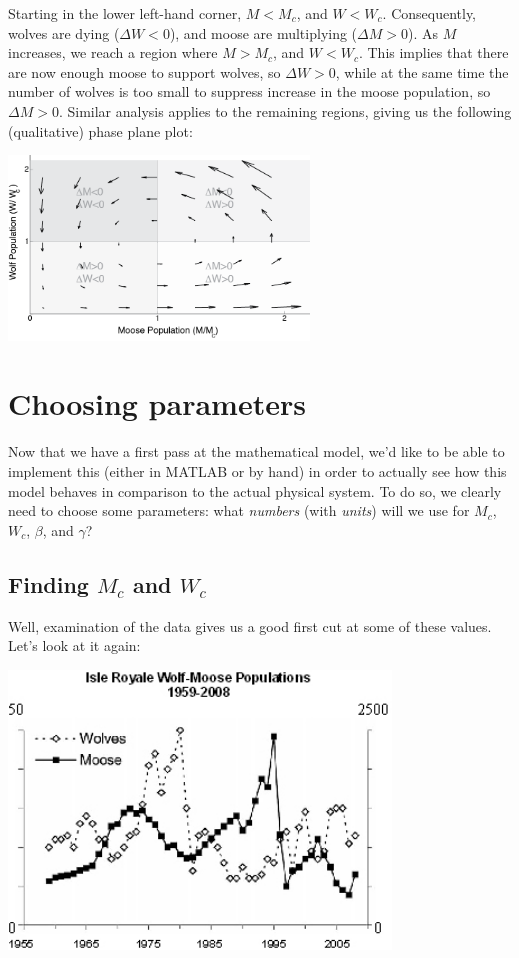 Starting in the lower left-hand corner, $M<M_c$, and $W<W_c$.  Consequently, wolves are dying ($\Delta W<0$), and moose are multiplying ($\Delta M>0$).  As $M$ increases, we reach a region where  $M>M_c$, and $W<W_c$.  This implies that there are now enough moose to support wolves, so $\Delta W>0$, while at the same time the number of wolves is too small to suppress increase in the moose population, so $\Delta M>0$.  Similar analysis applies to the remaining regions, giving us the following (qualitative) phase plane plot:

\beforefig
\centerline{
\includegraphics[width=8cm]{figs/WolfMoosePhasePlaneQuiver.png}}
\afterfig


 \section{Choosing parameters}
 
Now that we have a first pass at the mathematical model, we'd like to be able to implement this (either in MATLAB or by hand) in order to actually see how this model behaves in comparison to the actual physical system.  To do so, we clearly need to choose some parameters:  what {\it numbers} (with {\it units}) will we use for $M_c$, $W_c$, $\beta$, and $\gamma$?

\subsection{Finding $M_c$ and $W_c$}
Well, examination of the data gives us a good first cut at some of these values.  Let's look at it again:

\includegraphics[width=4in]{figs/wolfmoosedata.jpg}
 
